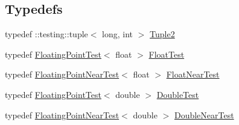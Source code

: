 \subsection*{Typedefs}
\begin{DoxyCompactItemize}
\item 
typedef \+::testing\+::tuple$<$ long, int $>$ \hyperlink{namespacetesting_1_1gmock__matchers__test_a8b82c859cd28da9e7f7d4c6091a3165c}{Tuple2}
\item 
typedef \hyperlink{classtesting_1_1gmock__matchers__test_1_1_floating_point_test}{Floating\+Point\+Test}$<$ float $>$ \hyperlink{namespacetesting_1_1gmock__matchers__test_a145329e433869625f9f0e98a0cdfd7b4}{Float\+Test}
\item 
typedef \hyperlink{classtesting_1_1gmock__matchers__test_1_1_floating_point_near_test}{Floating\+Point\+Near\+Test}$<$ float $>$ \hyperlink{namespacetesting_1_1gmock__matchers__test_a426b51f464dcb48033946e1bf3cc8795}{Float\+Near\+Test}
\item 
typedef \hyperlink{classtesting_1_1gmock__matchers__test_1_1_floating_point_test}{Floating\+Point\+Test}$<$ double $>$ \hyperlink{namespacetesting_1_1gmock__matchers__test_a944cdd366ed240f29ae8e3ebc753ad5c}{Double\+Test}
\item 
typedef \hyperlink{classtesting_1_1gmock__matchers__test_1_1_floating_point_near_test}{Floating\+Point\+Near\+Test}$<$ double $>$ \hyperlink{namespacetesting_1_1gmock__matchers__test_aea537d0183ccc65b5c49a75d711993c8}{Double\+Near\+Test}
\end{DoxyCompactItemize}
